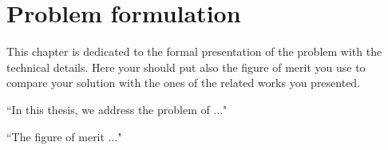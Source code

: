 \chapter{Problem formulation}
\label{ch:problem_formulation}

This chapter is dedicated to the formal presentation of the problem with the technical details. Here your should put also the figure of merit you use to compare your solution with the ones of the related works you presented.

``In this thesis, we address the problem of ..."

``The figure of merit ..."

